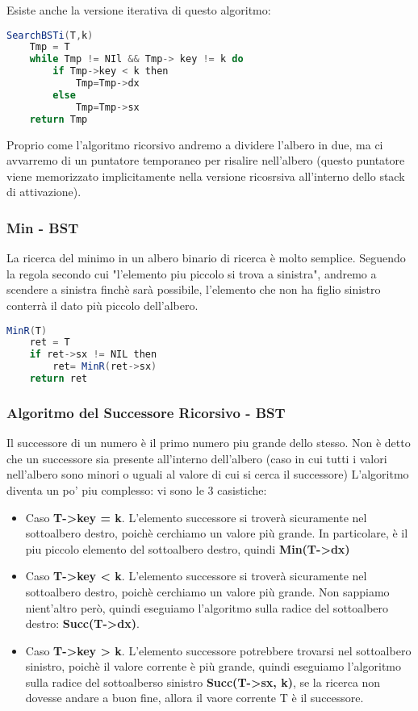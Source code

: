 Esiste anche la versione iterativa di questo algoritmo:

\begin{lstlisting}[language=Java]
	SearchBSTi(T,k)
	Tmp = T
	while Tmp != NIl && Tmp-> key != k do
		if Tmp->key < k then
			Tmp=Tmp->dx
		else
			Tmp=Tmp->sx
	return Tmp	
\end{lstlisting}

Proprio come l'algoritmo ricorsivo andremo a dividere l'albero in due, ma ci avvarremo di un puntatore temporaneo per risalire nell'albero (questo puntatore viene memorizzato implicitamente nella versione ricosrsiva all'interno dello stack di attivazione).

\subsubsection{Min - BST}
La ricerca del minimo in un albero binario di ricerca è molto semplice. Seguendo la regola secondo cui "l'elemento piu piccolo si trova a sinistra", andremo a scendere a sinistra finchè sarà possibile, l'elemento che non ha figlio sinistro conterrà il dato più piccolo dell'albero.

\begin{lstlisting}[language=Java]
	MinR(T)
	ret = T
	if ret->sx != NIL then
		ret= MinR(ret->sx)
	return ret
\end{lstlisting}

\subsubsection{Algoritmo del Successore Ricorsivo - BST}
Il successore di un numero è il primo numero piu grande dello stesso. Non è detto che un successore sia presente all'interno dell'albero (caso in cui tutti i valori nell'albero sono minori o uguali al valore di cui si cerca il successore) L'algoritmo diventa un po' piu complesso: vi sono le 3 casistiche:
\begin{itemize}
	\item Caso \textbf{T->key = k}. L'elemento successore si troverà sicuramente nel sottoalbero destro, poichè cerchiamo un valore più grande. In particolare, è il piu piccolo elemento del sottoalbero destro, quindi \textbf{Min(T->dx)}
	\item Caso \textbf{T->key < k}. L'elemento successore si troverà sicuramente nel sottoalbero destro, poichè cerchiamo un valore più grande. Non sappiamo nient'altro però, quindi eseguiamo l'algoritmo sulla radice del sottoalbero destro: \textbf{Succ(T->dx)}.
	\item Caso \textbf{T->key > k}. L'elemento successore potrebbere trovarsi nel sottoalbero sinistro, poichè il valore corrente è più grande, quindi eseguiamo l'algoritmo sulla radice del sottoalberso sinistro \textbf{Succ(T->sx, k)}, se la ricerca non dovesse andare a buon fine, allora il vaore corrente T è il successore.
\end{itemize}

